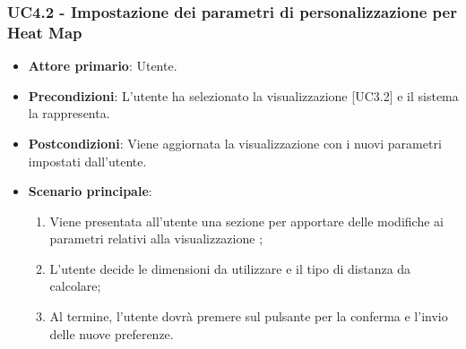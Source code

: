 \subsubsection{UC4.2 - Impostazione dei parametri di personalizzazione per Heat Map}
\begin{itemize}
	\item \textbf{Attore primario}: Utente.
	\item \textbf{Precondizioni}: L'utente ha selezionato la visualizzazione  [UC3.2] e il sistema la rappresenta.
	\item \textbf{Postcondizioni}: Viene aggiornata la visualizzazione  con i nuovi parametri impostati dall'utente.
	\item \textbf{Scenario principale}:
	\begin{enumerate}
			\item Viene presentata all'utente una sezione per apportare delle modifiche ai parametri relativi alla visualizzazione ;
			\item L'utente decide le dimensioni da utilizzare e il tipo di distanza da calcolare;
			\item Al termine, l'utente dovrà premere sul pulsante per la conferma e l'invio delle nuove preferenze.
		\end{enumerate}
\end{itemize}